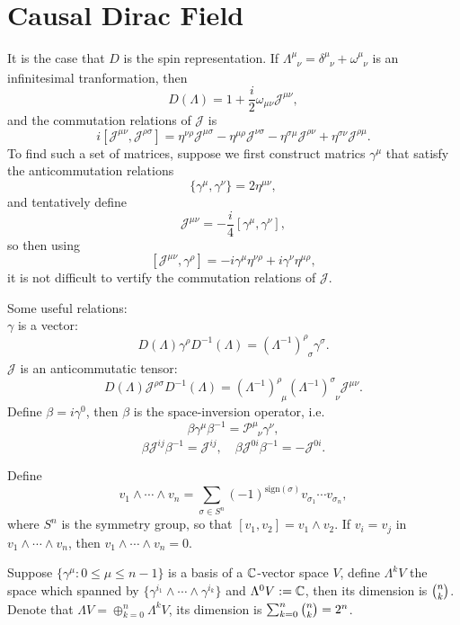 \documentclass[9pt]{extbook}
\begin{document}
\section{Causal Dirac Field}
It is the case that $D$ is the spin representation. If $\Lambda^\mu_{\phantom{\mu}\nu}=\delta^\mu_{\phantom{\mu}\nu}+\omega^\mu_{\phantom{\mu}\nu}$ is an infinitesimal tranformation, then
\[
	D(\Lambda)=1+\frac{i}{2}\omega_{\mu\nu} \mathscr{J}^{\mu\nu},
\]
and the commutation relations of $\mathscr{J}$ is
\[
	i\left[\mathscr{J}^{\mu\nu},\mathscr{J}^{\rho \sigma}\right]=
	\eta^{\nu\rho}\mathscr{J}^{\mu \sigma}-
	\eta^{\mu \rho}\mathscr{J}^{\nu \sigma}-
	\eta^{\sigma\mu}\mathscr{J}^{\rho \nu}+
	\eta^{\sigma\nu}\mathscr{J}^{\rho \mu}.
\]
To find such a set of matrices, suppose we first construct matrics $\gamma^\mu$ that satisfy the anticommutation relations
\[
	\{\gamma^\mu,\gamma^\nu\}=2\eta^{\mu\nu},
\]
and tentatively define
\[
	\mathscr{J}^{\mu\nu}=-\frac{i}{4}[\gamma^\mu,\gamma^\nu],
\]
so then using
\[
	[\mathscr{J}^{\mu\nu},\gamma^\rho]=-i\gamma^\mu \eta^{\nu\rho}+i\gamma^\nu \eta^{\mu\rho},
\]
it is not difficult to vertify the commutation relations of $\mathscr{J}$.

Some useful relations:\\
 $\gamma$ is a vector:
\[
	D(\Lambda)\gamma^\rho D^{-1}(\Lambda)=(\Lambda^{-1})^\rho_{\phantom{\rho}\sigma}\gamma^\sigma.
\]
 $\mathscr{J}$ is an anticommutatic tensor:
\[
	D(\Lambda)\mathscr{J}^{\rho\sigma} D^{-1}(\Lambda)=(\Lambda^{-1})^\rho_{\phantom{\rho}\mu}(\Lambda^{-1})^\sigma_{\phantom{\sigma}\nu}\mathscr{J}^{\mu\nu}.
\]
 Define $\beta=i\gamma^0$, then $\beta$ is the space-inversion operator, i.e.
\[
	\beta \gamma^\mu \beta^{-1}=\mathscr{P}^\mu_{\phantom{\mu}\nu}\gamma^\nu,
\]
\[
	\beta \mathscr{J}^{ij} \beta^{-1}=\mathscr{J}^{ij}, \quad \beta \mathscr{J}^{0i} \beta^{-1}=-\mathscr{J}^{0i}.
\]

Define
\[
	v_1\wedge \cdots \wedge v_n=\sum_{\sigma\in S^n}(-1)^{\mathrm{sign}(\sigma)}v_{\sigma_1}\cdots v_{\sigma_n},
\]
where $S^n$ is the symmetry group, so that $[v_1,v_2]=v_1\wedge v_2$. If $v_i=v_j$ in $v_1\wedge \cdots \wedge v_n$, then $v_1\wedge \cdots \wedge v_n=0$.

Suppose $\{\gamma^\mu: 0 \leq \mu \leq n-1\}$ is a basis of a $\mathbb{C}$-vector space $V$, define $\Lambda^kV$ the space which spanned by $\{\gamma^{i_1}\wedge \cdots \wedge \gamma^{i_k}\}$ and $\Lambda^0V:=\mathbb{C}$, then its dimension is $\tbinom{n}{k}$. Denote that $\Lambda V=\oplus_{k=0}^n \Lambda^kV$, its dimension is $\sum_{k=0}^{n}\tbinom{n}{k}=2^{n}$.
\end{document}
